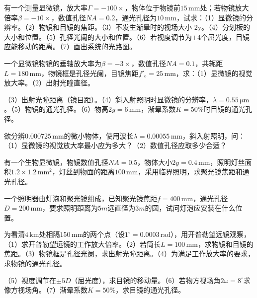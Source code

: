 \documentclass[padl, analysis, notocnum]{ExBook}
\newcommand{\answerarea}[1][3.5cm]{%
  \par\vspace{1mm}%
  \noindent{\color{themeColor!35}\rule{\linewidth}{0.4pt}}\par
  \noindent\begin{minipage}[t][#1][t]{\linewidth}\vspace{0pt}\end{minipage}\par
  \noindent{\color{themeColor!35}\rule{\linewidth}{0.4pt}}\par
}
\begin{document}
\begin{qitems}[startnum=3]
\qitem 有一个测量显微镜，放大率$\Gamma =-100\times$，物体位于物镜前$15\,\mathrm{mm}$处；若物镜放大倍率$\beta =-10\times$，数值孔径$NA=0.2$，通光孔径为$10\,\mathrm{mm}$，试求：（1）显微镜的分辨率。（2）物镜和目镜的焦距。（3）不发生渐晕时的视场大小 2y。（4）分划板的大小和位置。（5）孔径光阑的大小和位置。（6）若视度调节为$\pm 4$个屈光度，目镜应能移动的距离。（7）画出系统的光路图。
\label{q:165:start}
\answerarea[7.0cm]
\label{q:165:end}
\end{qitems}

\begin{qitems}[startnum=4]
\qitem 一个显微镜物镜的垂轴放大率为$\beta =-3\times$，数值孔径$NA=0.1$，共轭距$L=180\,\mathrm{mm}$，物镜框是孔径光阑，目镜焦距$f'_{e}=25\,\mathrm{mm}$，求：（1）显微镜的视觉放大率。（2）出射光瞳直径。
\par\noindent （3）出射光瞳距离（镜目距）。（4）斜入射照明时显微镜的分辨率，$\lambda =0.55\,\mathrm{\mu m}$。（5）物镜的通光孔径。（6）物高$2y=6\,\mathrm{mm}$，渐晕系数$K=50\%$时目镜的通光孔径。
\label{q:166:start}
\answerarea[7.0cm]
\label{q:166:end}
\end{qitems}

\begin{qitems}[startnum=5]
\qitem 欲分辨$0.000725\,\mathrm{mm}$的微小物体，使用波长$\lambda =0.00055\,\mathrm{mm}$，斜入射照明，问：（1）显微镜的视觉放大率最小应为多大？（2）数值孔径应取多少合适？
\label{q:167:start}
\answerarea[7.0cm]
\label{q:167:end}
\end{qitems}

\begin{qitems}[startnum=6]
\qitem 有一个生物显微镜，物镜数值孔径$NA=0.5$，物体大小$2y=0.4\,\mathrm{mm}$，照明灯丝面积$1.2\times 1.2\,\mathrm{mm}^{2}$，灯丝到物面的距离$100\,\mathrm{mm}$，采用临界照明，求聚光镜焦距和通光孔径。
\label{q:168:start}
\answerarea[7.0cm]
\label{q:168:end}
\end{qitems}

\begin{qitems}[startnum=7]
\qitem 一个照明器由灯泡和聚光镜组成，已知聚光镜焦距$f=400\,\mathrm{mm}$，通光孔径$D=200\,\mathrm{mm}$，要求照明距离为$5m$远直径为$3m$的圆，试问灯泡应安装在什么位置。
\label{q:169:start}
\answerarea[7.0cm]
\label{q:169:end}
\end{qitems}

\begin{qitems}[startnum=8]
\qitem 为看清$4\,\mathrm{km}$处相隔$150\,\mathrm{mm}$的两个点（设$1^{\circ}=0.0003\,\mathrm{rad}$），用开普勒望远镜观察，（1）求开普勒望远镜的工作放大倍率。（2）若筒长$L=100\,\mathrm{mm}$，求物镜和目镜的焦距。（3）物镜框是孔径光阑，求出射光瞳距离。（4）为满足工作放大率的要求，求物镜的通光孔径。
\par\noindent （5）视度调节在$\pm 5D$（屈光度），求目镜的移动量。（6）若物方视场角$2\omega =8^{\circ}$求像方视场角。（7）渐晕系数$K=50\%$，求目镜的通光孔径。
\label{q:170:start}
\answerarea[7.0cm]
\label{q:170:end}
\end{qitems}
\end{document}
